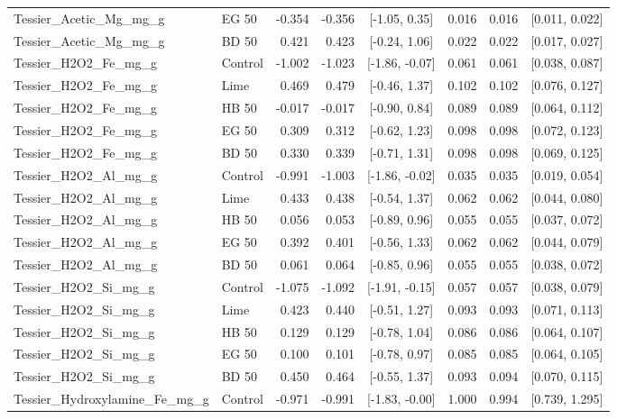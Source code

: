 \documentclass[preprint,12pt]{elsarticle}
\begin{document}
\begin{landscape}
\begin{longtable}{@{} >{\raggedright\arraybackslash}p{4.3cm} l r r c r r c @{}}
Tessier\_Acetic\_Mg\_mg\_g & EG 50 & -0.354 & -0.356 & [-1.05, 0.35] & 0.016 & 0.016 & [0.011, 0.022] \\
Tessier\_Acetic\_Mg\_mg\_g & BD 50 & 0.421 & 0.423 & [-0.24, 1.06] & 0.022 & 0.022 & [0.017, 0.027] \\
Tessier\_H2O2\_Fe\_mg\_g & Control & -1.002 & -1.023 & [-1.86, -0.07] & 0.061 & 0.061 & [0.038, 0.087] \\
Tessier\_H2O2\_Fe\_mg\_g & Lime & 0.469 & 0.479 & [-0.46, 1.37] & 0.102 & 0.102 & [0.076, 0.127] \\
Tessier\_H2O2\_Fe\_mg\_g & HB 50 & -0.017 & -0.017 & [-0.90, 0.84] & 0.089 & 0.089 & [0.064, 0.112] \\
Tessier\_H2O2\_Fe\_mg\_g & EG 50 & 0.309 & 0.312 & [-0.62, 1.23] & 0.098 & 0.098 & [0.072, 0.123] \\
Tessier\_H2O2\_Fe\_mg\_g & BD 50 & 0.330 & 0.339 & [-0.71, 1.31] & 0.098 & 0.098 & [0.069, 0.125] \\
Tessier\_H2O2\_Al\_mg\_g & Control & -0.991 & -1.003 & [-1.86, -0.02] & 0.035 & 0.035 & [0.019, 0.054] \\
Tessier\_H2O2\_Al\_mg\_g & Lime & 0.433 & 0.438 & [-0.54, 1.37] & 0.062 & 0.062 & [0.044, 0.080] \\
Tessier\_H2O2\_Al\_mg\_g & HB 50 & 0.056 & 0.053 & [-0.89, 0.96] & 0.055 & 0.055 & [0.037, 0.072] \\
Tessier\_H2O2\_Al\_mg\_g & EG 50 & 0.392 & 0.401 & [-0.56, 1.33] & 0.062 & 0.062 & [0.044, 0.079] \\
Tessier\_H2O2\_Al\_mg\_g & BD 50 & 0.061 & 0.064 & [-0.85, 0.96] & 0.055 & 0.055 & [0.038, 0.072] \\
Tessier\_H2O2\_Si\_mg\_g & Control & -1.075 & -1.092 & [-1.91, -0.15] & 0.057 & 0.057 & [0.038, 0.079] \\
Tessier\_H2O2\_Si\_mg\_g & Lime & 0.423 & 0.440 & [-0.51, 1.27] & 0.093 & 0.093 & [0.071, 0.113] \\
Tessier\_H2O2\_Si\_mg\_g & HB 50 & 0.129 & 0.129 & [-0.78, 1.04] & 0.086 & 0.086 & [0.064, 0.107] \\
Tessier\_H2O2\_Si\_mg\_g & EG 50 & 0.100 & 0.101 & [-0.78, 0.97] & 0.085 & 0.085 & [0.064, 0.105] \\
Tessier\_H2O2\_Si\_mg\_g & BD 50 & 0.450 & 0.464 & [-0.55, 1.37] & 0.093 & 0.094 & [0.070, 0.115] \\
Tessier\_\allowbreak{}Hydroxylamine\_\allowbreak{}Fe\_\allowbreak{}mg\_\allowbreak{}g & Control & -0.971 & -0.991 & [-1.83, -0.00] & 1.000 & 0.994 & [0.739, 1.295] \\

\end{longtable}
\end{landscape}
\end{document}
